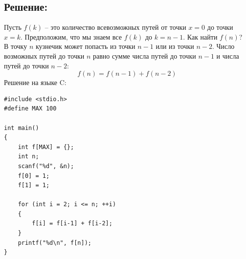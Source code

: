 \documentclass{article}
\begin{document}
\subsection*{Решение:}
Пусть $f(k)$ -- это количество всевозможных путей от точки $x = 0$ до точки $x = k$. Предположим, что мы знаем все $f(k)$ до $k = n - 1$. Как найти $f(n)$?\\
В точку $n$ кузнечик может попасть из точки $n - 1$ или из точки $n - 2$. Число возможных путей до точки $n$ равно сумме числа путей до точки $n - 1$ и числа путей до точки $n - 2$:
$$
f(n) = f(n-1) + f(n-2)
$$
Решение на языке C:
\begin{lstlisting}
#include <stdio.h>
#define MAX 100

int main()
{
	int f[MAX] = {};
	int n;
	scanf("%d", &n);
	f[0] = 1;
	f[1] = 1;

	for (int i = 2; i <= n; ++i)
	{
		f[i] = f[i-1] + f[i-2];
	}
	printf("%d\n", f[n]);
}
\end{lstlisting}
\end{document}
